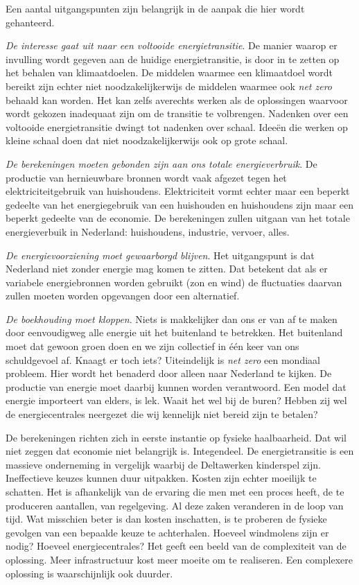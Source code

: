 \documentclass[
  11pt,
  a4paper,
]{book}
\begin{document}
Een aantal uitgangspunten zijn belangrijk in de aanpak die hier wordt gehanteerd.

\emph{De interesse gaat uit naar een voltooide energietransitie}. De manier waarop er invulling wordt gegeven aan de huidige energietransitie, is door in te zetten op het behalen van klimaatdoelen. De middelen waarmee een klimaatdoel wordt bereikt zijn echter niet noodzakelijkerwijs de middelen waarmee ook \emph{net zero} behaald kan worden. Het kan zelfs averechts werken als de oplossingen waarvoor wordt gekozen inadequaat zijn om de transitie te volbrengen. Nadenken over een voltooide energietransitie dwingt tot nadenken over schaal. Ideeën die werken op kleine schaal doen dat niet noodzakelijkerwijs ook op grote schaal.

\emph{De berekeningen moeten gebonden zijn aan ons totale energieverbruik}. De productie van hernieuwbare bronnen wordt vaak afgezet tegen het elektriciteitgebruik van huishoudens. Elektriciteit vormt echter maar een beperkt gedeelte van het energiegebruik van een huishouden en huishoudens zijn maar een beperkt gedeelte van de economie. De berekeningen zullen uitgaan van het totale energieverbuik in Nederland: huishoudens, industrie, vervoer, alles.

\emph{De energievoorziening moet gewaarborgd blijven}. Het uitgangspunt is dat Nederland niet zonder energie mag komen te zitten. Dat betekent dat als er variabele energiebronnen worden gebruikt (zon en wind) de fluctuaties daarvan zullen moeten worden opgevangen door een alternatief.

\emph{De boekhouding moet kloppen}. Niets is makkelijker dan ons er van af te maken door eenvoudigweg alle energie uit het buitenland te betrekken. Het buitenland moet dat gewoon groen doen en we zijn collectief in één keer van ons schuldgevoel af. Knaagt er toch iets? Uiteindelijk is \emph{net zero} een mondiaal probleem. Hier wordt het benaderd door alleen naar Nederland te kijken. De productie van energie moet daarbij kunnen worden verantwoord. Een model dat energie importeert van elders, is lek. Waait het wel bij de buren? Hebben zij wel de energiecentrales neergezet die wij kennelijk niet bereid zijn te betalen?

De berekeningen richten zich in eerste instantie op fysieke haalbaarheid. Dat wil niet zeggen dat economie niet belangrijk is. Integendeel. De energietransitie is een massieve onderneming in vergelijk waarbij de Deltawerken kinderspel zijn. Ineffectieve keuzes kunnen duur uitpakken. Kosten zijn echter moeilijk te schatten. Het is afhankelijk van de ervaring die men met een proces heeft, de te produceren aantallen, van regelgeving. Al deze zaken veranderen in de loop van tijd. Wat misschien beter is dan kosten inschatten, is te proberen de fysieke gevolgen van een bepaalde keuze te achterhalen. Hoeveel windmolens zijn er nodig? Hoeveel energiecentrales? Het geeft een beeld van de complexiteit van de oplossing. Meer infrastructuur kost meer moeite om te realiseren. Een complexere oplossing is waarschijnlijk ook duurder.
\end{document}
